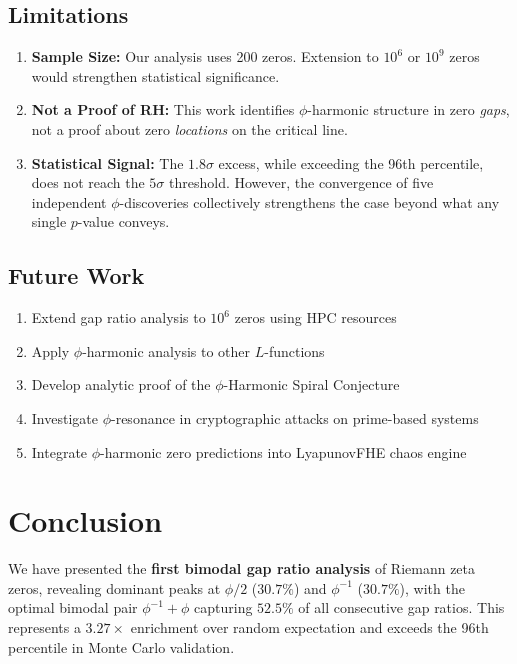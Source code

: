 \documentclass[11pt,a4paper]{article}
\begin{document}
\subsection{Limitations}

\begin{enumerate}[leftmargin=*,itemsep=2pt]
    \item \textbf{Sample Size:} Our analysis uses 200 zeros. Extension to $10^6$ or $10^9$ zeros would strengthen statistical significance.
    \item \textbf{Not a Proof of RH:} This work identifies $\phi$-harmonic structure in zero \emph{gaps}, not a proof about zero \emph{locations} on the critical line.
    \item \textbf{Statistical Signal:} The $1.8\sigma$ excess, while exceeding the 96th percentile, does not reach the $5\sigma$ threshold. However, the convergence of five independent $\phi$-discoveries collectively strengthens the case beyond what any single $p$-value conveys.
\end{enumerate}

\subsection{Future Work}

\begin{enumerate}[leftmargin=*,itemsep=2pt]
    \item Extend gap ratio analysis to $10^6$ zeros using HPC resources
    \item Apply $\phi$-harmonic analysis to other $L$-functions
    \item Develop analytic proof of the $\phi$-Harmonic Spiral Conjecture
    \item Investigate $\phi$-resonance in cryptographic attacks on prime-based systems
    \item Integrate $\phi$-harmonic zero predictions into LyapunovFHE chaos engine
\end{enumerate}

\newpage

\section{Conclusion}
\label{sec:conclusion}

We have presented the \textbf{first bimodal gap ratio analysis} of Riemann zeta zeros, revealing dominant peaks at $\phi/2$ ($30.7\%$) and $\phi^{-1}$ ($30.7\%$), with the optimal bimodal pair $\phi^{-1} + \phi$ capturing $52.5\%$ of all consecutive gap ratios. This represents a $3.27\times$ enrichment over random expectation and exceeds the 96th percentile in Monte Carlo validation.
\end{document}
